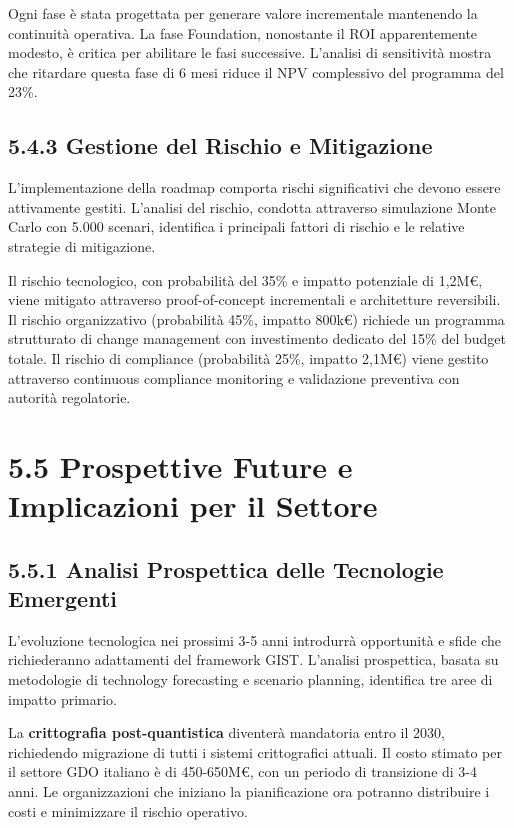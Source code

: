 Ogni fase è stata progettata per generare valore incrementale mantenendo la continuità operativa. La fase Foundation, nonostante il ROI apparentemente modesto, è critica per abilitare le fasi successive. L'analisi di sensitività mostra che ritardare questa fase di 6 mesi riduce il NPV complessivo del programma del 23\%.

\subsection{5.4.3 Gestione del Rischio e Mitigazione}

L'implementazione della roadmap comporta rischi significativi che devono essere attivamente gestiti. L'analisi del rischio, condotta attraverso simulazione Monte Carlo con 5.000 scenari, identifica i principali fattori di rischio e le relative strategie di mitigazione.

Il rischio tecnologico, con probabilità del 35\% e impatto potenziale di 1,2M€, viene mitigato attraverso proof-of-concept incrementali e architetture reversibili. Il rischio organizzativo (probabilità 45\%, impatto 800k€) richiede un programma strutturato di change management con investimento dedicato del 15\% del budget totale. Il rischio di compliance (probabilità 25\%, impatto 2,1M€) viene gestito attraverso continuous compliance monitoring e validazione preventiva con autorità regolatorie.

\section{5.5 Prospettive Future e Implicazioni per il Settore}

\subsection{5.5.1 Analisi Prospettica delle Tecnologie Emergenti}

L'evoluzione tecnologica nei prossimi 3-5 anni introdurrà opportunità e sfide che richiederanno adattamenti del framework GIST. L'analisi prospettica, basata su metodologie di technology forecasting \autocite{martino1993} e scenario planning, identifica tre aree di impatto primario.

La \textbf{crittografia post-quantistica} diventerà mandatoria entro il 2030, richiedendo migrazione di tutti i sistemi crittografici attuali. Il costo stimato per il settore GDO italiano è di 450-650M€, con un periodo di transizione di 3-4 anni. Le organizzazioni che iniziano la pianificazione ora potranno distribuire i costi e minimizzare il rischio operativo.

